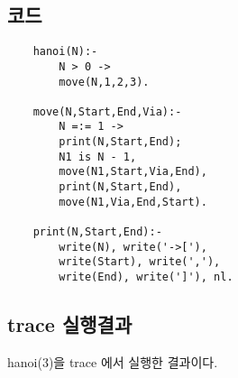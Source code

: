 \documentclass{article}
\begin{document}
\subsection{코드}
\begin{lstlisting}
	hanoi(N):-
		N > 0 ->
		move(N,1,2,3).	

	move(N,Start,End,Via):-
		N =:= 1 ->
		print(N,Start,End);
		N1 is N - 1,
		move(N1,Start,Via,End),
		print(N,Start,End),
		move(N1,Via,End,Start).

	print(N,Start,End):-
		write(N), write('->['),
		write(Start), write(','),
		write(End), write(']'), nl.
\end{lstlisting}

\subsection{trace 실행결과}
hanoi(3)을 trace 에서 실행한 결과이다.
\end{document}
